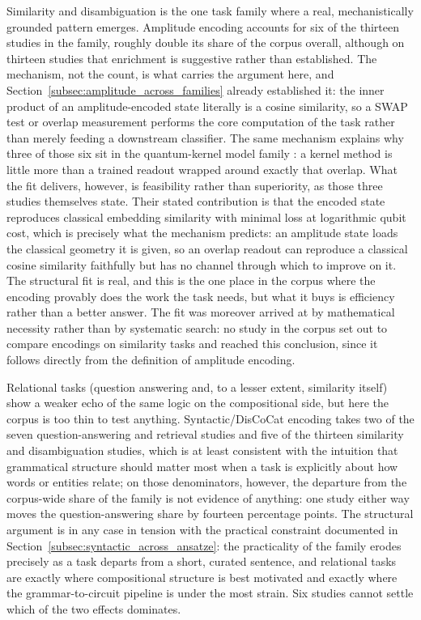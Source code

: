\documentclass{ieeeaccess}
\begin{document}
Similarity and disambiguation is the one task family where a real, mechanistically grounded pattern emerges. Amplitude encoding accounts for six of the thirteen studies in the family, roughly double its share of the corpus overall, although on thirteen studies that enrichment is suggestive rather than established. The mechanism, not the count, is what carries the argument here, and Section~\ref{subsec:amplitude_across_families} already established it: the inner product of an amplitude-encoded state literally is a cosine similarity, so a SWAP test or overlap measurement performs the core computation of the task rather than merely feeding a downstream classifier. The same mechanism explains why three of those six sit in the quantum-kernel model family \cite{cavar_word_2025,cavar_old_2026,cavar_semantic_2024}: a kernel method is little more than a trained readout wrapped around exactly that overlap. What the fit delivers, however, is feasibility rather than superiority, as those three studies themselves state. Their stated contribution is that the encoded state reproduces classical embedding similarity with minimal loss at logarithmic qubit cost, which is precisely what the mechanism predicts: an amplitude state loads the classical geometry it is given, so an overlap readout can reproduce a classical cosine similarity faithfully but has no channel through which to improve on it. The structural fit is real, and this is the one place in the corpus where the encoding provably does the work the task needs, but what it buys is efficiency rather than a better answer. The fit was moreover arrived at by mathematical necessity rather than by systematic search: no study in the corpus set out to compare encodings on similarity tasks and reached this conclusion, since it follows directly from the definition of amplitude encoding.

Relational tasks (question answering and, to a lesser extent, similarity itself) show a weaker echo of the same logic on the compositional side, but here the corpus is too thin to test anything. Syntactic/DisCoCat encoding takes two of the seven question-answering and retrieval studies and five of the thirteen similarity and disambiguation studies, which is at least consistent with the intuition that grammatical structure should matter most when a task is explicitly about how words or entities relate; on those denominators, however, the departure from the corpus-wide share of the family is not evidence of anything: one study either way moves the question-answering share by fourteen percentage points. The structural argument is in any case in tension with the practical constraint documented in Section~\ref{subsec:syntactic_across_ansatze}: the practicality of the family erodes precisely as a task departs from a short, curated sentence, and relational tasks are exactly where compositional structure is best motivated and exactly where the grammar-to-circuit pipeline is under the most strain. Six studies cannot settle which of the two effects dominates.
\end{document}
